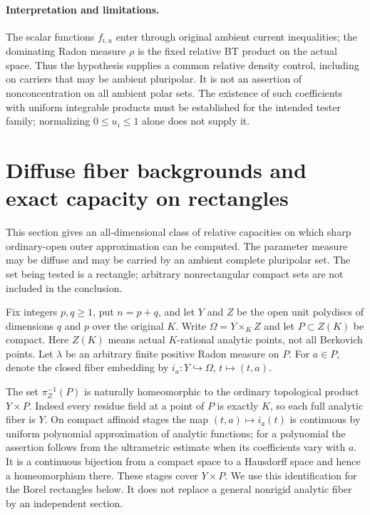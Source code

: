 \documentclass[11pt,a4paper]{article}
\numberwithin{equation}{section}
\theoremstyle{definition}
\theoremstyle{remark}
\begin{document}
\paragraph{Interpretation and limitations.}
The scalar functions $f_{i,u}$ enter through original ambient current
inequalities; the dominating Radon measure $\rho$ is the fixed
relative BT product on the actual space. Thus the hypothesis supplies
a common relative density control, including on carriers that may be
ambient pluripolar. It is not an assertion of nonconcentration on all
ambient polar sets. The existence of such coefficients with uniform
integrable products must be established for the intended tester
family; normalizing $0\le u_i\le1$ alone does not supply it.



\section{Diffuse fiber backgrounds and exact capacity on rectangles}
\label{sec:r6-laminar-rectangles}

This section gives an all-dimensional class of relative capacities on
which sharp ordinary-open outer approximation can be computed. The
parameter measure may be diffuse and may be carried by an ambient
complete pluripolar set. The set being tested is a rectangle; arbitrary
nonrectangular compact sets are not included in the conclusion.

Fix integers $p,q\geq1$, put $n=p+q$, and let $Y$ and $Z$ be the open
unit polydiscs of dimensions $q$ and $p$ over the original $K$.
Write $\Omega=Y\times_K Z$ and let $P\subset Z(K)$ be compact.
Here $Z(K)$ means actual $K$-rational analytic points, not all Berkovich
points. Let $\lambda$ be an arbitrary finite positive Radon measure on
$P$. For $a\in P$, denote the closed fiber embedding by
$i_a:Y\hookrightarrow\Omega$, $t\mapsto(t,a)$.

The set $\pi_Z^{-1}(P)$ is naturally homeomorphic to the ordinary
topological product $Y\times P$. Indeed every residue field at a point
of $P$ is exactly $K$, so each full analytic fiber is $Y$. On compact
affinoid stages the map $(t,a)\mapsto i_a(t)$ is continuous by uniform
polynomial approximation of analytic functions; for a polynomial the
assertion follows from the ultrametric estimate when its coefficients
vary with $a$. It is a continuous bijection from a compact space to a
Hausdorff space and hence a homeomorphism there. These stages cover
$Y\times P$. We use this identification for the Borel rectangles below.
It does not replace a general nonrigid analytic fiber by an independent
section.
\end{document}
